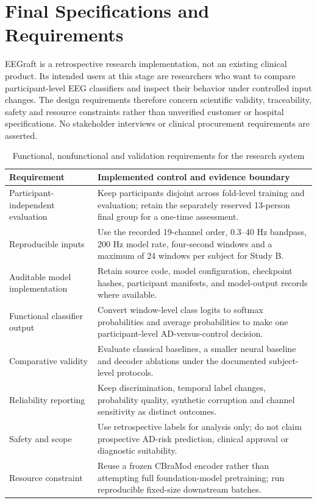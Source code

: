 \section{Final Specifications and Requirements}
EEGraft is a retrospective research implementation, not an existing clinical product. Its intended users at this stage are researchers who want to compare participant-level EEG classifiers and inspect their behavior under controlled input changes. The design requirements therefore concern scientific validity, traceability, safety and resource constraints rather than unverified customer or hospital specifications. No stakeholder interviews or clinical procurement requirements are asserted.

\begin{table}[H]\centering\small
\caption{Functional, nonfunctional and validation requirements for the research system}\label{tab:req}
\begin{tabularx}{\textwidth}{@{}>{\RaggedRight\arraybackslash}p{}>{\RaggedRight\arraybackslash}X@{}}\toprule
\textbf{Requirement}&\textbf{Implemented control and evidence boundary}\\\midrule
Participant-independent evaluation&Keep participants disjoint across fold-level training and evaluation; retain the separately reserved 13-person final group for a one-time assessment.\\
Reproducible inputs&Use the recorded 19-channel order, 0.3--40 Hz bandpass, 200 Hz model rate, four-second windows and a maximum of 24 windows per subject for Study B.\\
Auditable model implementation&Retain source code, model configuration, checkpoint hashes, participant manifests, and model-output records where available.\\
Functional classifier output&Convert window-level class logits to softmax probabilities and average probabilities to make one participant-level AD-versus-control decision.\\
Comparative validity&Evaluate classical baselines, a smaller neural baseline and decoder ablations under the documented subject-level protocols.\\
Reliability reporting&Keep discrimination, temporal label changes, probability quality, synthetic corruption and channel sensitivity as distinct outcomes.\\
Safety and scope&Use retrospective labels for analysis only; do not claim prospective AD-risk prediction, clinical approval or diagnostic suitability.\\
Resource constraint&Reuse a frozen CBraMod encoder rather than attempting full foundation-model pretraining; run reproducible fixed-size downstream batches.\\
\bottomrule\end{tabularx}\end{table}

